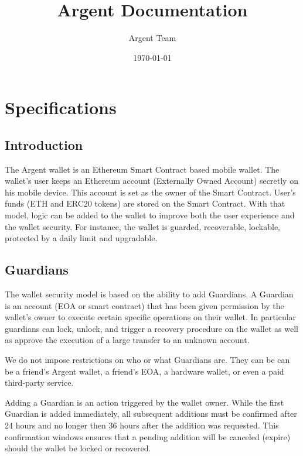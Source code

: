 \documentclass[12pt]{article}
\title{Argent Documentation}
\author{Argent Team}
\date{\today}
\begin{document}
\maketitle

\section{Specifications}

\subsection{Introduction}

The Argent wallet is an Ethereum Smart Contract based mobile wallet. The wallet's user keeps an Ethereum account (Externally Owned Account) secretly on his mobile device. This account is set as the owner of the Smart Contract. User's funds (ETH and ERC20 tokens) are stored on the Smart Contract. With that model, logic can be added to the wallet to improve both the user experience and the wallet security. For instance, the wallet is guarded, recoverable, lockable, protected by a daily limit and upgradable.

\subsection{Guardians}

The wallet security model is based on the ability to add Guardians. A Guardian is an account (EOA or smart contract) that has been given permission by the wallet's owner to execute certain specific operations on their wallet. In particular guardians can lock, unlock, and trigger a recovery procedure on the wallet as well as approve the execution of a large transfer to an unknown account.

We do not impose restrictions on who or what Guardians are. They can be can be a friend's Argent wallet, a friend's EOA, a hardware wallet, or even a paid third-party service.

Adding a Guardian is an action triggered by the wallet owner. While the first Guardian is added immediately, all subsequent additions must be confirmed after 24 hours and no longer then 36 hours after the addition was requested. This confirmation windows ensures that a pending addition will be canceled (expire) should the wallet be locked or recovered.
\end{document}

